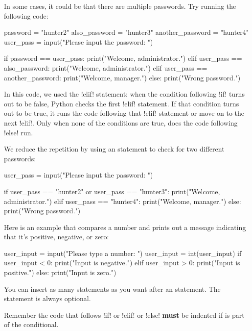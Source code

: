 \documentclass[11pt]{cselabheader}
\begin{document}
In some cases, it could be that there are multiple passwords. Try running the
following code:

\begin{python3code}
password = "hunter2"
also_password = "hunter3"
another_password = "hunter4"
user_pass = input("Please input the password: ")

if password == user_pass:
    print("Welcome, administrator.")
elif user_pass == also_password:
    print("Welcome, administrator.")
elif user_pass == another_password:
    print("Welcome, manager.")
else:
    print("Wrong password.")
\end{python3code}

In this code, we used the \pythoninline!elif! statement: when the condition
following \pythoninline!if! turns out to be false, Python checks the first
\pythoninline!elif! statement. If that condition turns out to be true, it runs
the code following that \pythoninline!elif! statement or move on to the next
\pythoninline!elif!. Only when none of the conditions are true,
does the code following \pythoninline!else! run.

We reduce the repetition by using an 
statement to check for two different passwords:

\begin{python3code}
user_pass = input("Please input the password: ")

if user_pass == "hunter2" or user_pass == "hunter3":
    print("Welcome, administrator.")
elif user_pass == "hunter4":
    print("Welcome, manager.")
else:
    print("Wrong password.")
\end{python3code}

Here is an example that compares a number and prints out a message
indicating that it's positive, negative, or zero:

\begin{python3code}
user_input = input("Please type a number: ")
user_input = int(user_input)
if user_input < 0:
    print("Input is negative.")
elif user_input > 0:
    print("Input is positive.")
else:
    print("Input is zero.")
\end{python3code}

You can insert as many  statements as you want
after an  statement. The  statement
is always optional.

Remember the code that follows \pythoninline!if! or
\pythoninline!elif! or \pythoninline!else! \textbf{must} be indented
if is part of the conditional.
\end{document}
